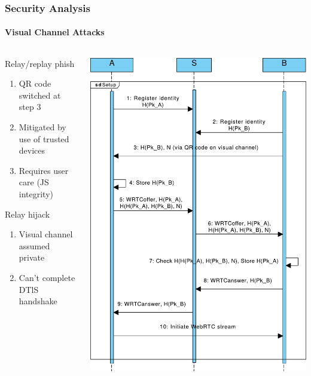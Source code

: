 \documentclass[handout, notes=hide]{beamer}
\begin{document}

\begin{frame}
\frametitle{Security Analysis}
\framesubtitle{Visual Channel Attacks}

\begin{columns}[T]
\begin{column}[T]{0.6\textwidth}
\setlength{\parskip}{0.5em}

Relay/replay phish
\begin{enumerate}
\item QR code switched at step 3
\item Mitigated by use of trusted devices
\item Requires user care (JS integrity)
\end{enumerate}

Relay hijack
\begin{enumerate}
\item Visual channel assumed private
\item Can't complete DTlS handshake
\end{enumerate}

\end{column}
\begin{column}[T]{0.4\textwidth}
\includegraphics[width=1.0\textwidth]{core-qr-thin}
\end{column}
\end{columns}
\end{frame}
\end{document}
